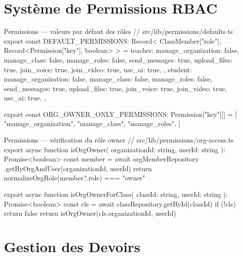 \documentclass[12pt, a4paper, twoside]{report}
\begin{document}
\section{Système de Permissions RBAC}

\begin{codesnap}[TypeScript]{Permissions — valeurs par défaut des rôles}
// src/lib/permissions/defaults.ts
export const DEFAULT_PERMISSIONS: Record<
  ClassMember["role"],
  Record<Permission["key"], boolean>
> = {
  teacher: {
    manage_organization: false, manage_class: false,
    manage_roles: false,        send_messages: true,
    upload_files: true,         join_voice: true,
    join_video: true,           use_ai: true,
  },
  student: {
    manage_organization: false, manage_class: false,
    manage_roles: false,        send_messages: true,
    upload_files: true,         join_voice: true,
    join_video: true,           use_ai: true,
  },
}

export const ORG_OWNER_ONLY_PERMISSIONS: Permission["key"][] = [
  "manage_organization", "manage_class", "manage_roles",
]
\end{codesnap}

\begin{codesnap}[TypeScript]{Permissions — vérification du rôle owner}
// src/lib/permissions/org-access.ts
export async function isOrgOwner(
  organizationId: string,
  userId: string
): Promise<boolean> {
  const member = await orgMemberRepository
    .getByOrgAndUser(organizationId, userId)
  return normalizeOrgRole(member?.role) === "owner"
}

export async function isOrgOwnerForClass(
  classId: string,
  userId: string
): Promise<boolean> {
  const cls = await classRepository.getById(classId)
  if (!cls) return false
  return isOrgOwner(cls.organizationId, userId)
}
\end{codesnap}

\section{Gestion des Devoirs}
\end{document}
